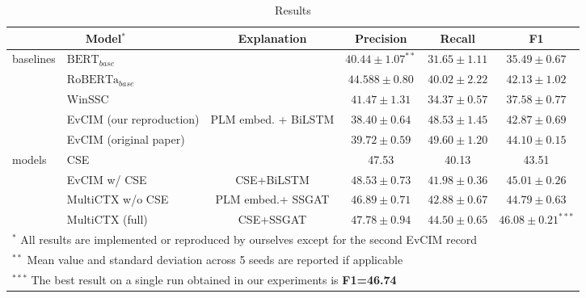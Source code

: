 \documentclass[letterpaper]{article} %
\begin{document}
\begin{table}[htbp]
  \centering \scriptsize
    \begin{tabular}{l|l|cccc}
    \toprule[1pt]
     \multicolumn{2}{c}{ \textbf{Model$^{*}$}} & \textbf{Explanation} & \textbf{Precision} & \textbf{Recall} & \textbf{F1} \\
    \midrule
    \multirow{5}{*}{baselines} & $\text{BERT}_{base}$  &  & $40.44 \pm 1.07^{**}$ & $31.65\pm1.11$& $35.49\pm 0.67$ \\ \cline{2-6}
    &$\text{RoBERTa}_{base}$ & & $44.588\pm0.80$ & $40.02 \pm 2.22$    & $42.13 \pm 1.02$ \\  \cline{2-6}
    &WinSSC & &$41.47\pm1.31$& $34.37\pm 0.57$  & $37.58 \pm 0.77$ \\ \cline{2-6}
    &EvCIM (our reproduction)
     &  \multirow{2}{*}{PLM embed. + BiLSTM} & $38.40 \pm 0.64$   & $48.53\pm 1.45$& $42.87 \pm 0.69$ \\
    &EvCIM (original paper)
      &  & $39.72\pm 0.59$ &  $49.60 \pm 1.20$ & $44.10\pm 0.15$ \\ \hline
    \multirow{4}{1cm}{models}&CSE   &  & 47.53     & 40.13     & 43.51  \\ \cline{2-6}
    &EvCIM w/ CSE & CSE+BiLSTM &$48.53 \pm 0.73$     & $41.98\pm 0.36$    & $45.01 \pm 0.26$\\ \cline{2-6}
    &MultiCTX w/o CSE & PLM embed.+ SSGAT &   $46.89 \pm 0.71$  &  $42.88\pm 0.67$   & $44.79 \pm 0.63$ \\ \cline{2-6}
    &MultiCTX (full) & CSE+SSGAT &  $47.78 \pm 0.94$   &  $44.50 \pm 0.65$   & $\mathbf{46.08 \pm 0.21}^{***}$ \\
    \bottomrule[1pt]
    \multicolumn{5}{l}{$^{*}$ \scriptsize All results are implemented or reproduced by ourselves except for the second EvCIM record} &\\
    \multicolumn{5}{l}{$^{**}$  \scriptsize Mean value and standard deviation across 5 seeds are reported if applicable} & \\
    \multicolumn{6}{l}{$^{***}$  \scriptsize The best result on a single run obtained in our experiments is \textbf{F1=46.74}} \\

    \end{tabular}%
  \caption{ Results}
  \label{tab:res}%
\end{table}%
\end{document}
